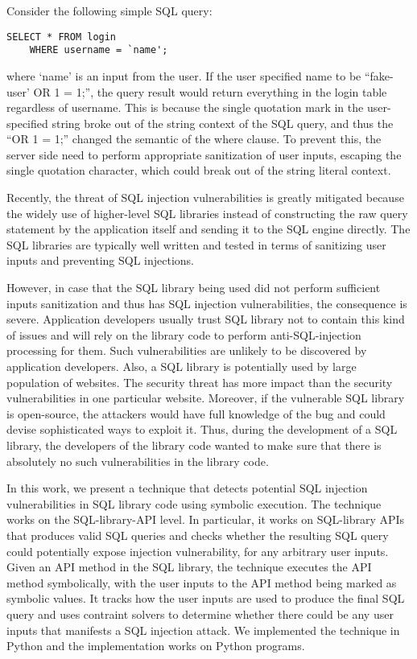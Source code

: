 \documentclass[conference]{IEEEtran}
\begin{document}
Consider the following simple SQL query:
\begin{lstlisting}[breaklines=true]
	SELECT * FROM login 
	WHERE username = `name';
\end{lstlisting}
where `name' is an input from the user.
If the user specified name to be ``fake-user' OR 1 = 1;'', the query result would return everything in the login table regardless of username. This is because the single quotation mark in the user-specified string broke out of the string context of the SQL query, and thus the ``OR 1 = 1;'' changed the semantic of the where clause.
To prevent this, the server side need to perform appropriate sanitization of user inputs, escaping the single quotation character, which could break out of the string literal context.

Recently, the threat of SQL injection vulnerabilities is greatly mitigated because the widely use of higher-level SQL libraries instead of constructing the raw query statement by the application itself and sending it to the SQL engine directly. The SQL libraries are typically well written and tested in terms of sanitizing user inputs and preventing SQL injections. 

However, in case that the SQL library being used did not perform sufficient inputs sanitization and thus has SQL injection vulnerabilities, the consequence is severe. Application developers usually trust SQL library not to contain this kind of issues and will rely on the library code to perform anti-SQL-injection processing for them. Such vulnerabilities are unlikely to be discovered by application developers. Also, a SQL library is potentially used by large population of websites. The security threat has more impact than the security vulnerabilities in one particular website. Moreover, if the vulnerable SQL library is open-source, the attackers would have full knowledge of the bug and could devise sophisticated ways to exploit it. Thus, during the development of a SQL library, the developers of the library code wanted to make sure that there is absolutely no such vulnerabilities in the library code.

In this work, we present a technique that detects potential SQL injection vulnerabilities in SQL library code using symbolic execution. The technique works on the SQL-library-API level. In particular, it works on SQL-library APIs that produces valid SQL queries and checks whether the resulting SQL query could potentially expose injection vulnerability, for any arbitrary user inputs. Given an API method in the SQL library, the technique executes the API method symbolically, with the user inputs to the API method being marked as symbolic values. It tracks how the user inputs are used to produce the final SQL query and uses contraint solvers to determine whether there could be any user inputs that manifests a SQL injection attack. We implemented the technique in Python and the implementation works on Python programs.
\end{document}
